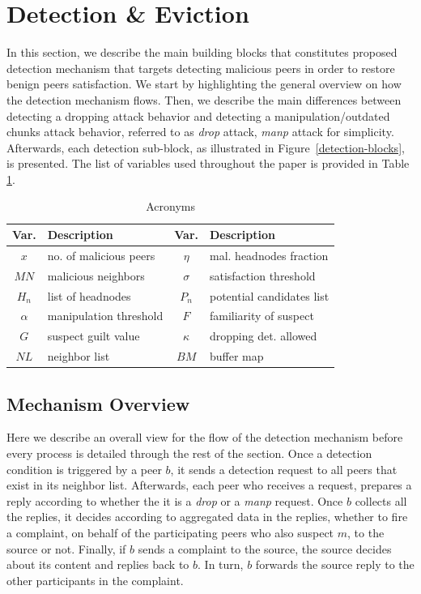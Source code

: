 \section{Detection \& Eviction}
\label{sec:detection}

In this section, we describe the main building blocks that constitutes proposed detection mechanism that targets detecting malicious peers in order to restore benign peers satisfaction.
We start by highlighting the general overview on how the detection mechanism flows.
Then, we describe the main differences between detecting a dropping attack behavior and detecting a manipulation/outdated chunks attack behavior, referred to as \textit{drop} attack, \textit{manp} attack for simplicity.
Afterwards, each detection sub-block, as illustrated in Figure~\ref{detection-blocks}, is presented.
The list of variables used throughout the paper is provided in Table \ref{tab:acronyms}.

\begin{table}[ht]
\center
\caption{Acronyms}
\begin{tabular}{|c|l||c|l|}
\hline

\bf{Var.} & \bf{Description}  & \bf{Var.} & \bf{Description} \\\hline\hline
$x$ & no. of malicious peers & $\eta$ & mal. headnodes fraction\\\hline
$MN$ & malicious neighbors & $\sigma$ & satisfaction threshold\\\hline
$H_n$ & list of headnodes & $P_n$ & potential candidates list \\\hline
$\alpha$ & manipulation threshold& $F$ & familiarity of suspect \\\hline
$G$ & suspect guilt value & $\kappa$ & dropping det. allowed\\\hline
$NL$ & neighbor list & $BM$ & buffer map\\\hline
\end{tabular}
\label{tab:acronyms}
\end{table}

\subsection{Mechanism Overview}
Here we describe an overall view for the flow of the detection mechanism before every process is detailed through the rest of the section.
Once a detection condition is triggered by a peer $b$, it sends a detection request to all peers that exist in its neighbor list.
Afterwards, each peer who receives a request, prepares a reply according to whether the it is a \textit{drop} or a \textit{manp} request.
Once $b$ collects all the replies, it decides according to aggregated data in the replies, whether to fire a complaint, on behalf of the participating peers who also suspect $m$, to the source or not.
Finally, if $b$ sends a complaint to the source, the source decides about its content and replies back to $b$. In turn, $b$ forwards the source reply to the other participants in the complaint.

